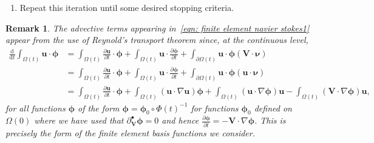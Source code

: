 \documentclass[a4paper]{amsart}
\numberwithin{equation}{section}
\newcommand{\ddt}[1]{\frac{\partial #1}{\partial t}}
\newcommand{\matdev}{\partial^{\bullet}}
\newcommand{\grad}{\nabla}
\theoremstyle{plain}
\newtheorem{remark}[theorem]{Remark}
\newcommand{\mbf}[1]{\mathbf{#1}}
\newcommand{\mbb}[1]{\mathbb{#1}}
\begin{document}
\begin{enumerate}
\begin{subequations}
\begin{gather}
        \frac{\mbb{J}_{n,h}^{k}\boldsymbol{\omega}_{n,h}^{k+1} - \mbb{J}_{n-1,h}^k\boldsymbol{\omega}_{n-1,h}^{k+1}}{\tau} = -\int_{\partial B_{n,h}^k} (\mbf{x} - \mbf{q}_{n,h}^k) \times \mbb{T}_{n,h}^k \boldsymbol{\nu}_{n,h}^k, \label{eqn: finite element angular ODE}
    \end{gather}
    \end{subequations}
    where
    \begin{gather*}
        \mbb{T}_{n,h}^k := -p_{n,h}^k\mbb{I} + \mu\left( \grad \mbf{u}_{n,h}^k + (\grad \mbf{u}_{n,h}^k)^T \right),\\
        \mbb{J}_{n,h}^k := \int_{B_{n,h}^k} \rho_B \left( |\mbf{x} - \mbf{q}_{n,h}^k|^2 \mbb{I} - (\mbf{x} - \mbf{q}_{n,h}^k) \otimes (\mbf{x} - \mbf{q}_{n,h}^k) \right).
    \end{gather*}
    Note that here the initial conditions known since
    \[ \mbf{q}^{k+1}_{0,h} = \mbf{q}^{k}_{0,h}, \quad \mbf{v}^{k+1}_{0,h} = \mbf{v}^{k}_{0,h}, \quad \boldsymbol{\omega}^{k+1}_{0,h} = \boldsymbol{\omega}^{k}_{0,h}. \]
    \item Repeat this iteration until some desired stopping criteria.
\end{enumerate}

\begin{remark}
    \label{remark: finite element advective term}
    The advective terms appearing in~\eqref{eqn: finite element navier stokes1} appear from the use of Reynold's transport theorem since, at the continuous level,
    \begin{align*}
    \frac{\mathrm{d}}{\mathrm{d}t} \int_{\Omega(t)} \mbf{u} \cdot \boldsymbol{\phi} &= \int_{\Omega(t)} \ddt{\mbf{u}} \cdot \boldsymbol{\phi} + \int_{\Omega(t)} {\mbf{u}} \cdot \ddt{\boldsymbol{\phi}} + \int_{\partial \Omega(t)} \mbf{u} \cdot \boldsymbol{\phi} (\mbf{V} \cdot \boldsymbol{\nu})\\
    &= \int_{\Omega(t)} \ddt{\mbf{u}} \cdot \boldsymbol{\phi} +  \int_{\Omega(t)} {\mbf{u}} \cdot \ddt{\boldsymbol{\phi}} + \int_{\partial \Omega(t)} \mbf{u} \cdot \boldsymbol{\phi} (\mbf{u} \cdot \boldsymbol{\nu})\\
    &= \int_{\Omega(t)} \ddt{\mbf{u}} \cdot \boldsymbol{\phi} + \int_{\Omega(t)} (\mbf{u} \cdot \grad \mbf{u}) \boldsymbol{\phi} + \int_{\Omega(t)} (\mbf{u} \cdot \grad \boldsymbol{\phi}) \mbf{u} - \int_{\Omega(t)} (\mbf{V}\cdot \grad \boldsymbol{\phi}) \mbf{u},
    \end{align*}
    for all functions $\boldsymbol{\phi}$ of the form $\boldsymbol{\phi} = \boldsymbol{\phi}_0 \circ \Phi(t)^{-1}$ for functions $\boldsymbol{\phi}_0$ defined on $\Omega(0)$ where we have used that $\matdev_{\mbf{V}} \boldsymbol{\phi} = 0$ and hence $\ddt{\boldsymbol{\phi}} = -\mbf{V} \cdot \grad \boldsymbol{\phi}$.
    This is precisely the form of the finite element basis functions we consider.
\end{remark}
\end{document}
